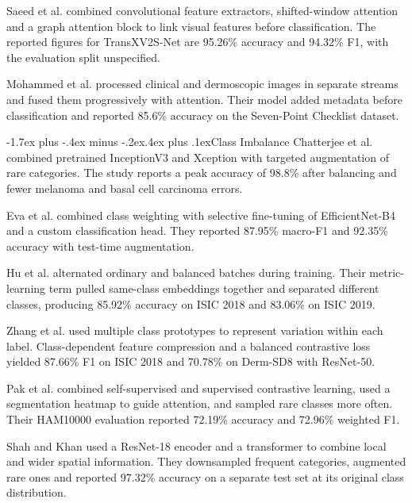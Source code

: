 \documentclass[11pt,a4paper]{article}
\makeatletter
\renewcommand\subsection{\@startsection{subsection}{2}{\z@}%
  {-1.7ex plus -.4ex minus -.2ex}{.4ex plus .1ex}{\sffamily\normalsize\bfseries}}
\makeatother
\begin{document}
Saeed et al. \citep{surveySaeed} combined convolutional feature extractors, shifted-window attention and a graph attention block to link visual features before classification. The reported figures for TransXV2S-Net are 95.26\% accuracy and 94.32\% F1, with the evaluation split unspecified.

Mohammed et al. \citep{surveyMohammed} processed clinical and dermoscopic images in separate streams and fused them progressively with attention. Their model added metadata before classification and reported 85.6\% accuracy on the Seven-Point Checklist dataset.

\subsection{Class Imbalance}
Chatterjee et al. \citep{surveyChatterjee} combined pretrained InceptionV3 and Xception with targeted augmentation of rare categories. The study reports a peak accuracy of 98.8\% after balancing and fewer melanoma and basal cell carcinoma errors.

Eva et al. \citep{surveyEva} combined class weighting with selective fine-tuning of EfficientNet-B4 and a custom classification head. They reported 87.95\% macro-F1 and 92.35\% accuracy with test-time augmentation.

Hu et al. \citep{surveyHu} alternated ordinary and balanced batches during training. Their metric-learning term pulled same-class embeddings together and separated different classes, producing 85.92\% accuracy on ISIC 2018 and 83.06\% on ISIC 2019.

Zhang et al. \citep{surveyZhang} used multiple class prototypes to represent variation within each label. Class-dependent feature compression and a balanced contrastive loss yielded 87.66\% F1 on ISIC 2018 and 70.78\% on Derm-SD8 with ResNet-50.

Pak et al. \citep{surveyPak} combined self-supervised and supervised contrastive learning, used a segmentation heatmap to guide attention, and sampled rare classes more often. Their HAM10000 evaluation reported 72.19\% accuracy and 72.96\% weighted F1.

Shah and Khan \citep{surveyShah} used a ResNet-18 encoder and a transformer to combine local and wider spatial information. They downsampled frequent categories, augmented rare ones and reported 97.32\% accuracy on a separate test set at its original class distribution.
\end{document}
